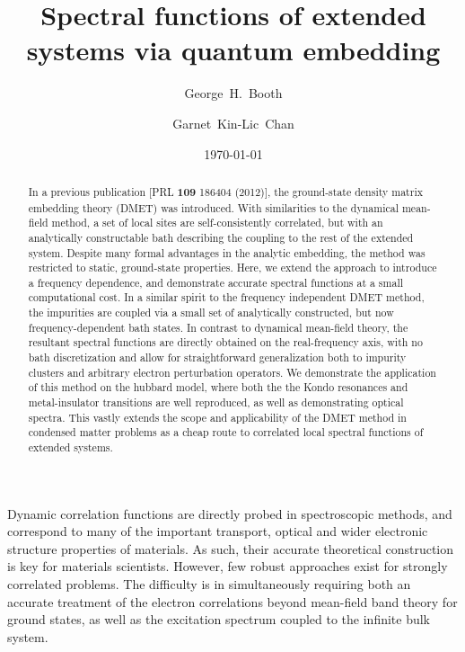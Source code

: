 \documentclass[aps,showpacs,twocolumn,nobibnotes]{revtex4}
\begin{document}
\title{Spectral functions of extended systems via quantum embedding}
\author{George~H.~Booth}
\author{Garnet~Kin-Lic~Chan}  

\begin{abstract}
In a previous publication [PRL {\bf 109} 186404 (2012)], the ground-state density matrix embedding theory (DMET) was introduced. With similarities 
to the dynamical mean-field method, a set of local sites are self-consistently correlated, but with an analytically constructable bath describing the
coupling to the rest of the extended system. 
Despite many formal advantages in the analytic embedding, the method was restricted to static, ground-state properties.
Here, we extend the approach to introduce a frequency dependence, and demonstrate accurate spectral functions at a small 
computational cost. In a similar spirit to the frequency independent DMET method, the impurities are coupled via a small set of 
analytically constructed, but now frequency-dependent bath states. In contrast to dynamical mean-field theory, the resultant 
spectral functions are directly obtained on the real-frequency axis, with no bath discretization and allow for straightforward generalization both 
to impurity clusters and arbitrary electron perturbation operators. We demonstrate
the application of this method on the hubbard model, where both the the Kondo resonances and metal-insulator transitions are well reproduced, as well as 
demonstrating optical spectra. This vastly extends the scope and applicability 
of the DMET method in condensed matter problems as a cheap route to correlated local spectral functions of extended systems.
\end{abstract}
\date{\today}
\maketitle

Dynamic correlation functions are directly probed in spectroscopic methods, and correspond to many of the important transport, optical and 
wider electronic structure properties of materials. As such, their accurate theoretical construction is key for materials scientists. 
However, few robust approaches exist for strongly correlated problems. The difficulty is in simultaneously requiring both an accurate 
treatment of the electron correlations beyond mean-field band theory for 
ground states, as well as the excitation spectrum coupled to the infinite bulk
system.
\end{document}
